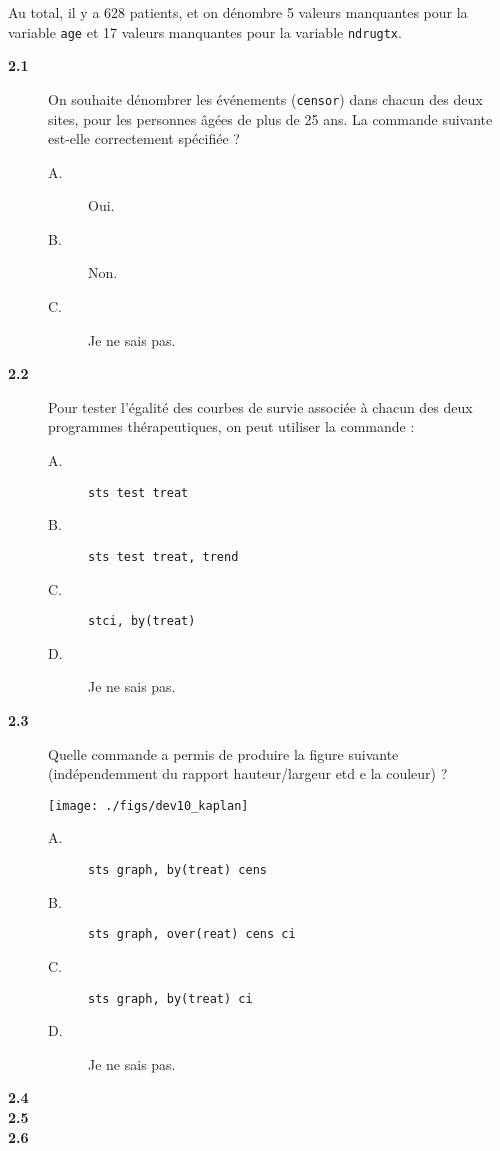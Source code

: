 Au total, il y a 628 patients, et on dénombre 5 valeurs manquantes pour la
variable \texttt{age} et 17 valeurs manquantes pour la variable
\texttt{ndrugtx}. 
\begin{description}
\item[\bf 2.1] On souhaite dénombrer les événements (\texttt{censor}) dans
  chacun des deux sites, pour les personnes âgées de plus de 25 ans. La
  commande suivante est-elle correctement spécifiée ? 
\begin{description}
\item[A.] Oui.
\item[B.] Non.
\item[C.] Je ne sais pas.
\end{description}
\item[\bf 2.2] Pour tester l'égalité des courbes de survie associée à chacun
  des deux programmes thérapeutiques, on peut utiliser la commande :
\begin{description}
\item[A.] \verb|sts test treat|
\item[B.] \verb|sts test treat, trend|
\item[C.] \verb|stci, by(treat)|
\item[D.] Je ne sais pas.
\end{description}
\item[\bf 2.3] Quelle commande a permis de produire la figure suivante
  (indépendemment du rapport hauteur/largeur etd e la couleur) ?
  \begin{center}
    \texttt{[image: ./figs/dev10\_kaplan]}
  \end{center}
\begin{description}
\item[A.] \verb|sts graph, by(treat) cens|
\item[B.] \verb|sts graph, over(reat) cens ci|
\item[C.] \verb|sts graph, by(treat) ci|
\item[D.] Je ne sais pas.
\end{description}
\item[\bf 2.4] 
\item[\bf 2.5] 
\item[\bf 2.6] 
\end{description}
